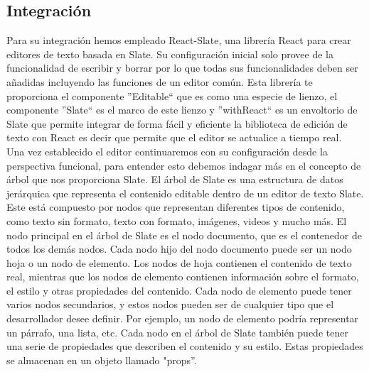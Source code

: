 \subsection{Integración}
Para su integración hemos empleado React-Slate, una librería React para crear editores de texto basada en Slate. Su configuración inicial solo provee de la funcionalidad de escribir y borrar por lo que todas sus funcionalidades deben ser añadidas incluyendo las funciones de un editor común. Esta librería te proporciona el componente ''Editable`` que es como una especie de lienzo,  el componente ''Slate`` es el marco de este lienzo y ''withReact`` es un envoltorio de Slate que permite integrar de forma fácil y eficiente la biblioteca de edición de texto con React es decir que permite que el editor se actualice a tiempo real.
\\
Una vez establecido el editor continuaremos con su configuración desde la perspectiva funcional, para entender esto debemos indagar más en el concepto de árbol que nos proporciona Slate. El árbol de Slate es una estructura de datos jerárquica que representa el contenido editable dentro de un editor de texto Slate. Este está compuesto por nodos que representan diferentes tipos de contenido, como texto sin formato, texto con formato, imágenes, videos y mucho más. El nodo principal en el árbol de Slate es el nodo documento, que es el contenedor de todos los demás nodos. Cada nodo hijo del nodo documento puede ser un nodo hoja o un nodo de elemento. Los nodos de hoja contienen el contenido de texto real, mientras que los nodos de elemento contienen información sobre el formato, el estilo y otras propiedades del contenido. Cada nodo de elemento puede tener varios nodos secundarios, y estos nodos pueden ser de cualquier tipo que el desarrollador desee definir. Por ejemplo, un nodo de elemento podría representar un párrafo, una lista, etc. Cada nodo en el árbol de Slate también puede tener una serie de propiedades que describen el contenido y su estilo. Estas propiedades se almacenan en un objeto llamado "props”.
\\
